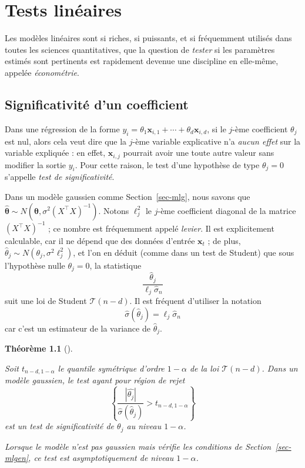 \documentclass[
  10,
  letterpaper,
  DIV=11,
  numbers=noendperiod]{scrreport}
\newcommand{\bx}{\mathbf{x}}
\newcommand{\bt}{\boldsymbol{\theta}}
\theoremstyle{plain}
\newtheorem{theorem}{Théorème}[chapter]
\theoremstyle{definition}
\theoremstyle{plain}
\theoremstyle{definition}
\theoremstyle{definition}
\theoremstyle{plain}
\theoremstyle{remark}
\begin{document}

\hypertarget{tests-linuxe9aires}{%
\chapter{Tests linéaires}\label{tests-linuxe9aires}}

Les modèles linéaires sont si riches, si puissants, et si fréquemment
utilisés dans toutes les sciences quantitatives, que la question de
\emph{tester} si les paramètres estimés sont pertinents est rapidement
devenue une discipline en elle-même, appelée \emph{économétrie}.

\hypertarget{significativituxe9-dun-coefficient}{%
\section{Significativité d'un
coefficient}\label{significativituxe9-dun-coefficient}}

Dans une régression de la forme
\(y_i = \theta_1 \bx_{i,1}+ \dotsb + \theta_d \bx_{i,d}\), si le
\(j\)-ème coefficient \(\theta_j\) est nul, alors cela veut dire que la
\(j\)-ème variable explicative n'a \emph{aucun effet} sur la variable
expliquée : en effet, \(\bx_{i,j}\) pourrait avoir une toute autre
valeur sans modifier la sortie \(y_i\). Pour cette raison, le test d'une
hypothèse de type \(\theta_j = 0\) s'appelle \emph{test de
significativité}.

Dans un modèle gaussien comme Section~\ref{sec-mlg}, nous savons que
\(\hat{\bt}\sim N(\bt, \sigma^2(X^\top X)^{-1})\). Notons \(\ell_j^2\)
le \(j\)-ème coefficient diagonal de la matrice \((X^\top X)^{-1}\) ; ce
nombre est fréquemment appelé \emph{levier}. Il est explicitement
calculable, car il ne dépend que des données d'entrée \(\bx_t\) ; de
plus, \(\hat{\theta}_j \sim N(\theta_j, \sigma^2 \ell_{j}^2)\), et l'on
en déduit (comme dans un test de Student) que sous l'hypothèse nulle
\(\theta_j=0\), la statistique
\[\frac{ \hat{\theta}_j}{\ell_j \hat{\sigma}_n} \] suit une loi de
Student \(\mathscr{T}(n-d)\). Il est fréquent d'utiliser la notation
\[ \hat{\sigma}(\hat{\theta}_j) = \ell_j \hat{\sigma}_n\] car c'est un
estimateur de la variance de \(\hat{\theta}_j\).

\begin{theorem}[]\protect\hypertarget{thm-teststudent}{}\label{thm-teststudent}

Soit \(t_{n-d, 1-\alpha}\) le quantile symétrique d'ordre \(1-\alpha\)
de la loi \(\mathscr{T}(n-d)\). Dans un modèle gaussien, le test ayant
pour région de rejet
\[\left\lbrace  \frac{|\hat{\theta_j}|}{\hat{\sigma}(\hat{\theta}_j)}> t_{n-d, 1-\alpha}\right\rbrace\]
est un test de significativité de \(\theta_j\) au niveau \(1-\alpha\).

Lorsque le modèle n'est pas gaussien mais vérifie les conditions de
Section~\ref{sec-mlgen}, ce test est asymptotiquement de niveau
\(1-\alpha\).

\end{theorem}
\end{document}
